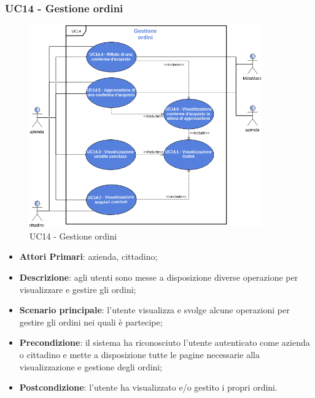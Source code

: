 \subsubsection{UC14 - Gestione ordini}
\begin{figure}[h]
	\includegraphics[width=10cm]{res/images/UC14-GestioneOrdini.png}
	\centering
	\caption{UC14 - Gestione ordini}
\end{figure}
\begin{itemize}
	\item \textbf{Attori Primari}: azienda, cittadino;
	\item \textbf{Descrizione}: agli utenti sono messe a disposizione diverse operazione per visualizzare e gestire gli ordini;
	\item \textbf{Scenario principale}: l'utente visualizza e svolge alcune operazioni per gestire gli ordini nei quali è partecipe;
	\item \textbf{Precondizione}: il sistema ha riconosciuto l'utente autenticato come azienda o cittadino e mette a disposizione tutte le pagine necessarie alla visualizzazione e gestione degli ordini;
	\item \textbf{Postcondizione}: l'utente ha visualizzato e/o gestito i propri ordini.
\end{itemize} 
